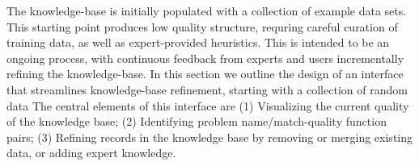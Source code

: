 
The \systemname knowledge-base is initially populated with a collection of example data sets.
This starting point produces low quality structure, requring careful curation of training data, as well as expert-provided heuristics.
This is intended to be an ongoing process, with continuous feedback from experts and users incrementally refining the knowledge-base.
In this section we outline the design of an interface that streamlines knowledge-base refinement, starting with a collection of random data
The central elements of this interface are 
(1) Visualizing the current quality of the knowledge base;
(2) Identifying problem name/match-quality function pairs;
(3) Refining records in the knowledge base by removing or merging existing data, or adding expert knowledge.
